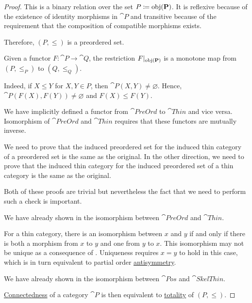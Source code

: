 \begin{proof}
  This is a binary relation over the set \( P \coloneqq \operatorname{obj}(\operatorname{\mathbf{P}}) \). It is reflexive because of the existence of identity morphisms in \( \cat{P} \) and transitive because of the requirement that the composition of compatible morphisms exists.

  Therefore, \( (P, \leq) \) is a preordered set.

  Given a functor \( F: \cat{P} \to \cat{Q} \), the restriction \( F\vert_{\operatorname{obj}(\operatorname{\mathbf{P}})} \) is a monotone map from \( (P, \leq_P) \) to \( (Q, \leq_Q) \).

  Indeed, if \( X \leq Y \) for \( X, Y \in P \), then \( \cat{P}(X, Y) \neq \varnothing \). Hence, \( \cat{P}(F(X), F(Y)) \neq \varnothing \) and \( F(X) \leq F(Y) \).

   We have implicitly defined a functor from \( \cat{PreOrd} \) to \( \cat{Thin} \) and vice versa. Isomorphism of \( \cat{PreOrd} \) and \( \cat{Thin} \) requires that these functors are mutually inverse.

  We need to prove that the induced preordered set for the induced thin category of a preordered set is the same as the original. In the other direction, we need to prove that the induced thin category for the induced preordered set of a thin category is the same as the original.

  Both of these proofs are trivial but nevertheless the fact that we need to perform such a check is important.

   We have already shown in  the isomorphism between \( \cat{PreOrd} \) and \( \cat{Thin} \).

  For a thin category, there is an isomorphism between \( x \) and \( y \) if and only if there is both a morphism from \( x \) to \( y \) and one from \( y \) to \( x \). This isomorphism may not be unique as a consequence of . Uniqueness requires \( x = y \) to hold in this case, which is in turn equivalent to partial order \hyperref[def:binary_relation/antisymmetric]{antisymmetry}.

   We have already shown in  the isomorphism between \( \cat{Pos} \) and \( \cat{SkelThin} \).

  \hyperref[def:connected_category]{Connectedness} of a category \( \cat{P} \) is then equivalent to \hyperref[def:binary_relation/total]{totality} of \( (P, \leq) \).
\end{proof}

